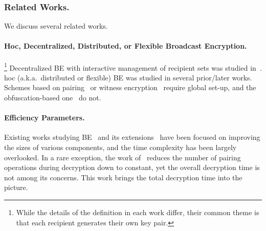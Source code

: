 \subsubsection{Related Works.}
We discuss several related works.

\paragraph{\Ad Hoc, Decentralized, Distributed, or Flexible
Broadcast Encryption.}
\leavevmode\unskip\footnote{
While the details of the definition in each work differ,
their common theme is that each recipient generates their own key pair.}
Decentralized BE
with interactive management of recipient sets
was studied in~\cite{SCN:PhaPoiStr12,PAIRING:DelPaiPoi07}.
\Ad hoc (a.k.a.~distributed or flexible) BE
was studied in several prior/later works.
Schemes based on
pairing~\cite{DHMR08,CCS:WQZD10,KolMalWee23} or
witness encryption~\cite{C:FreWatWu23}
require global set-up, and
the obfuscation-based one~\cite{C:BonZha14} do not.

\paragraph{Efficiency Parameters.}
Existing works studying
BE~\cite{C:FiaNao93,C:BonGenWat05,EC:GenWat09,C:BonWatZha14,EC:AgrYam20,TCC:AgrWicYam20,EPRINT:BraVai20,C:Zhandry20,EC:Wee22}
and
its extensions~\cite{PAIRING:DelPaiPoi07,AC:Delerablee07,EPRINT:SakFur07,C:BonZha14}
have been focused on improving the sizes of various components,
and the time complexity has been largely overlooked.
In a rare exception,
the work of~\cite{PKC:AttLib10}
reduces the number of pairing operations during decryption down to constant,
yet the overall decryption time is not among its concerns.
This work brings the total decryption time into the picture.

